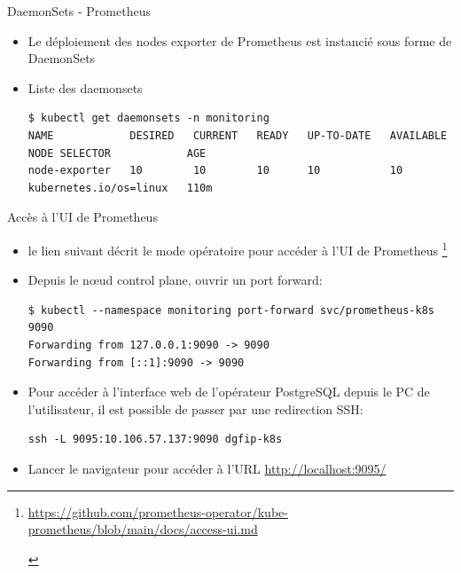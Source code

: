 
\begin{frame}[fragile]{DaemonSets - Prometheus}

   \begin{itemize}
      \item Le déploiement des nodes exporter de Prometheus est instancié sous forme de DaemonSets
      \item Liste des daemonsets
\begin{tiny}
\begin{Verbatim}[commandchars=\\\{\}]
$ kubectl get daemonsets -n monitoring
NAME            DESIRED   CURRENT   READY   UP-TO-DATE   AVAILABLE   NODE SELECTOR            AGE
node-exporter   10        10        10      10           10          kubernetes.io/os=linux   110m
\end{Verbatim}
\end{tiny}
   \end{itemize}

\end{frame}


\begin{frame}[fragile]{Accès à l'UI de Prometheus}

\begin{itemize}
   \item le lien suivant décrit le mode opératoire pour accéder à l'UI de Prometheus \footnote{
         \begin{tcolorbox}
         \tiny{\url{https://github.com/prometheus-operator/kube-prometheus/blob/main/docs/access-ui.md}}
         \end{tcolorbox}
      }
\item Depuis le n\oe{}ud control plane, ouvrir un port forward:
\begin{tiny}
\begin{Verbatim}[commandchars=\\\{\}]
$ kubectl --namespace monitoring port-forward svc/prometheus-k8s 9090
Forwarding from 127.0.0.1:9090 -> 9090
Forwarding from [::1]:9090 -> 9090
\end{Verbatim}
\end{tiny}
\item Pour accéder à l'interface web de l'opérateur PostgreSQL depuis le PC de l'utilisateur, il est possible de passer par une redirection SSH:
\begin{tiny}
\begin{Verbatim}[commandchars=\&\{\}]
ssh -L 9095:10.106.57.137:9090 dgfip-k8s
\end{Verbatim}
\end{tiny}
\item Lancer le navigateur pour accéder à l'URL \url{http://localhost:9095/}
\end{itemize}

\end{frame}

